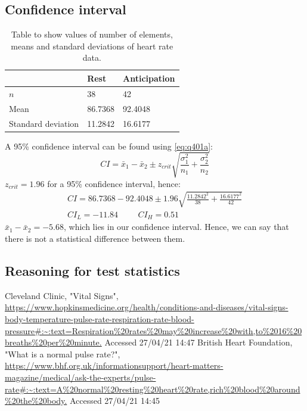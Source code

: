 \documentclass[11pt]{article}
\numberwithin{equation}{section}
\begin{document}
\subsection{Confidence interval}

\begin{table}[H]
    \centering
    \begin{tabular}{lll}
        \toprule
        & \textbf{Rest} & \textbf{Anticipation}\\
        \midrule
        $n$ & 38 & 42\\
        Mean & 86.7368 & 92.4048 \\
        Standard deviation & 11.2842 & 16.6177\\
        \bottomrule
    \end{tabular}
    \caption{Table to show values of number of elements, means and standard deviations of heart rate data.}
\end{table}
A 95\% confidence interval can be found using \ref{eq:q401a}:
\begin{equation}
    CI = \bar{x}_1 - \bar{x}_2 \pm z_{crit} \sqrt{\frac{\sigma_1^2}{n_1} + \frac{\sigma_2^2}{n_2}} \label{eq:q401a}
\end{equation}
$z_{crit} = 1.96$ for a 95\% confidence interval, hence:
\begin{gather}
    CI = 86.7368 - 92.4048 \pm 1.96 \sqrt{\frac{11.2842^2}{38} + \frac{16.6177^2}{42}}\\
    CI_L = -11.84 \hspace{1cm} CI_H = 0.51
\end{gather} 
$\bar{x}_1 - \bar{x}_2 = -5.68$, which lies in our confidence interval. Hence, we can say that there is not a statistical difference between them.
\subsection{Reasoning for test statistics}
\begin{thebibliography}{00}
     Cleveland Clinic, "Vital Signs", \url{https://www.hopkinsmedicine.org/health/conditions-and-diseases/vital-signs-body-temperature-pulse-rate-respiration-rate-blood-pressure#:~:text=Respiration%20rates%20may%20increase%20with,to%2016%20breaths%20per%20minute.} Accessed 27/04/21 14:47
     British Heart Foundation, "What is a normal pulse rate?", \url{https://www.bhf.org.uk/informationsupport/heart-matters-magazine/medical/ask-the-experts/pulse-rate#:~:text=A%20normal%20resting%20heart%20rate,rich%20blood%20around%20the%20body.} Accessed 27/04/21 14:45
\end{thebibliography}
\end{document}
